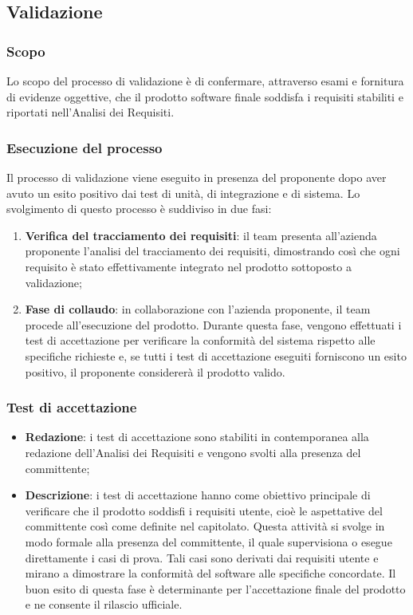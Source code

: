 \subsection{Validazione}
\subsubsection{Scopo}
Lo scopo del processo di validazione è di confermare, attraverso esami e fornitura di evidenze oggettive, che il prodotto software finale soddisfa i requisiti stabiliti e riportati nell'Analisi dei Requisiti. 

\subsubsection{Esecuzione del processo}
Il processo di validazione viene eseguito in presenza del proponente dopo aver avuto un esito positivo dai test di unità, di integrazione e di sistema. Lo svolgimento di questo processo è suddiviso in due fasi:
\begin{enumerate}
    \item \textbf{Verifica del tracciamento dei requisiti}: il team presenta all’azienda proponente l’analisi del tracciamento dei requisiti, dimostrando così che ogni requisito è stato effettivamente integrato nel prodotto sottoposto a validazione;
    \item \textbf{Fase di collaudo}: in collaborazione con l’azienda proponente, il team procede all’esecuzione del prodotto. Durante questa fase, vengono effettuati i test di accettazione per verificare la conformità del sistema rispetto alle specifiche richieste e, se tutti i test di accettazione eseguiti forniscono un esito positivo, il proponente considererà il prodotto valido.
\end{enumerate}

\subsubsection{Test di accettazione}
\begin{itemize}
    \item \textbf{Redazione}: i test di accettazione sono stabiliti in contemporanea alla redazione dell'Analisi dei Requisiti e vengono svolti alla presenza del committente;
    \item \textbf{Descrizione}: i test di accettazione hanno come obiettivo principale di verificare che il prodotto soddisfi i requisiti utente, cioè le aspettative del committente così come definite nel capitolato. Questa attività si svolge in modo formale alla presenza del committente, il quale supervisiona o esegue direttamente i casi di prova. Tali casi sono derivati dai requisiti utente e mirano a dimostrare la conformità del software alle specifiche concordate. Il buon esito di questa fase è determinante per l’accettazione finale del prodotto e ne consente il rilascio ufficiale.
\end{itemize}